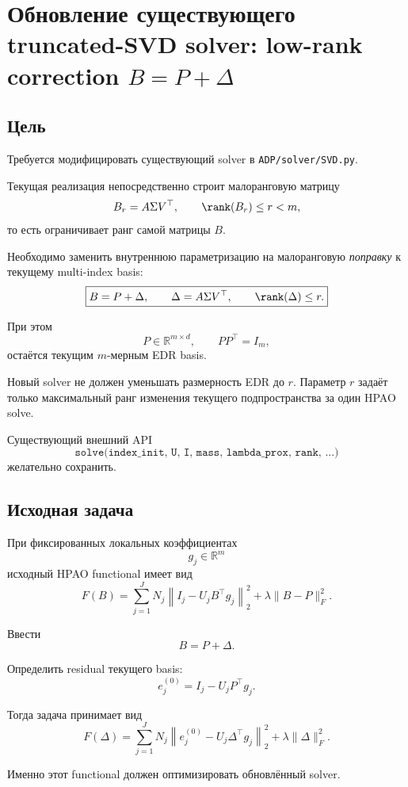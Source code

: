 \section{Обновление существующего truncated-SVD solver:
low-rank correction $B=P+\Delta$}

\subsection{Цель}

Требуется модифицировать существующий solver в
\texttt{ADP/solver/SVD.py}.

Текущая реализация непосредственно строит малоранговую матрицу
\[
    B_r=A\Sigma V^\top,
    \qquad
    \rank(B_r)\le r<m,
\]
то есть ограничивает ранг самой матрицы $B$.

Необходимо заменить внутреннюю параметризацию на малоранговую
\emph{поправку} к текущему multi-index basis:
\[
\boxed{
    B=P+\Delta,
    \qquad
    \Delta=A\Sigma V^\top,
    \qquad
    \rank(\Delta)\le r.
}
\]

При этом
\[
    P\in\mathbb R^{m\times d},
    \qquad
    PP^\top=I_m,
\]
остаётся текущим $m$-мерным EDR basis.

Новый solver не должен уменьшать размерность EDR до $r$.
Параметр $r$ задаёт только максимальный ранг изменения текущего
подпространства за один HPAO solve.

Существующий внешний API
\[
    \texttt{solve(index\_init, U, I, mass, lambda\_prox, rank, ...)}
\]
желательно сохранить.

\subsection{Исходная задача}

При фиксированных локальных коэффициентах
\[
    g_j\in\mathbb R^m
\]
исходный HPAO functional имеет вид
\[
    F(B)
    =
    \sum_{j=1}^{J}
    N_j
    \left\|
        I_j-U_jB^\top g_j
    \right\|_2^2
    +
    \lambda
    \|B-P\|_F^2.
\]

Ввести
\[
    B=P+\Delta.
\]

Определить residual текущего basis:
\[
\boxed{
    e_j^{(0)}
    =
    I_j-U_jP^\top g_j.
}
\]

Тогда задача принимает вид
\[
\boxed{
    F(\Delta)
    =
    \sum_{j=1}^{J}
    N_j
    \left\|
        e_j^{(0)}
        -
        U_j\Delta^\top g_j
    \right\|_2^2
    +
    \lambda\|\Delta\|_F^2.
}
\]

Именно этот functional должен оптимизировать обновлённый solver.

